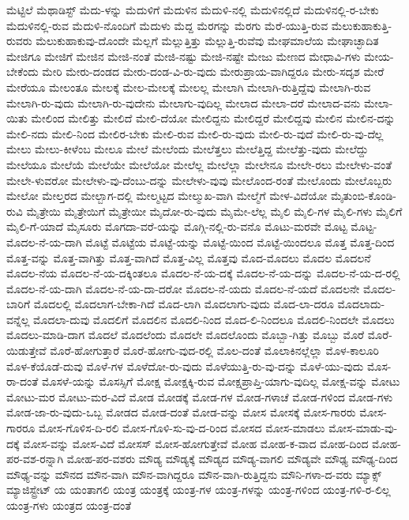 {ಮೆಟ್ಟಿಲೆ
ಮೆಥಾಡಿಸ್ಟ್
ಮೆದು-ಳನ್ನು
ಮೆದುಳಿಗೆ
ಮೆದುಳಿನ
ಮೆದುಳಿ-ನಲ್ಲಿ
ಮೆದುಳಿನಲ್ಲಿದೆ
ಮೆದುಳಿನಲ್ಲಿ-ರ-ಬೇಕು
ಮೆದುಳಿನಲ್ಲಿ-ರುವ
ಮೆದುಳಿ-ನೊಂದಿಗೆ
ಮೆದುಳು
ಮೆದ್ದ
ಮೆರಗನ್ನು
ಮೆರಗು
ಮೆರೆ-ಯುತ್ತಿ-ರುವ
ಮೆಲುಕುಹಾಕುತ್ತಿ-ರುವರು
ಮೆಲುಕುಹಾಕುವು-ದೊಂದೇ
ಮೆಲ್ಲಗೆ
ಮೆಲ್ಲುತ್ತಿತ್ತು
ಮೆಲ್ಲುತ್ತಿ-ರುವೆವು
ಮೇಘಮಾಲೆಯ
ಮೇಘಾಚ್ಛಾದಿತ
ಮೇಜಿಗೂ
ಮೇಜಿಗೆ
ಮೇಜಿನ
ಮೇಜಿ-ನಂತೆ
ಮೇಜಿ-ನಷ್ಟು
ಮೇಜಿ-ನಷ್ಟೇ
ಮೇಜು
ಮೇಣದ
ಮೇಧಾವಿ-ಗಳು
ಮೇಯ-ಬೇಕೆಂದು
ಮೇರಿ
ಮೇರು-ದಂಡದ
ಮೇರು-ದಂಡ-ವಿ-ರು-ವುದು
ಮೇರುಪ್ರಾಯ-ವಾಗಿದ್ದರೂ
ಮೇರು-ಸದೃಶ
ಮೇರೆ
ಮೇರೆಯೂ
ಮೇಲಂತೂ
ಮೇಲಕ್ಕೆ
ಮೇಲ-ಮೇಲಕ್ಕೆ
ಮೇಲಲ್ಲ
ಮೇಲಾಗಿ
ಮೇಲಾಗಿ-ರುತ್ತಿದ್ದೆವು
ಮೇಲಾಗಿ-ರುವ
ಮೇಲಾಗಿ-ರು-ವುದು
ಮೇಲಾಗಿ-ರು-ವುದೇನು
ಮೇಲಾಗು-ವುದಿಲ್ಲ
ಮೇಲಾದ
ಮೇಲಾ-ದರೆ
ಮೇಲಾದ-ವನು
ಮೇಲಾ-ಯಿತು
ಮೇಲಿಂದ
ಮೇಲಿತ್ತು
ಮೇಲಿದೆ
ಮೇಲಿ-ದೆಯೋ
ಮೇಲಿದ್ದನು
ಮೇಲಿದ್ದರೆ
ಮೇಲಿದ್ದವು
ಮೇಲಿನ
ಮೇಲಿನ-ದನ್ನು
ಮೇಲಿ-ನದು
ಮೇಲಿ-ನಿಂದ
ಮೇಲಿರ-ಬೇಕು
ಮೇಲಿ-ರುವ
ಮೇಲಿ-ರು-ವುದು
ಮೇಲಿ-ರು-ವುದೆ
ಮೇಲಿ-ರು-ವು-ದೆಲ್ಲ
ಮೇಲು
ಮೇಲು-ಕೀಳೆಂಬ
ಮೇಲೂ
ಮೇಲೆ
ಮೇಲೆಂದು
ಮೇಲೆತ್ತಲು
ಮೇಲೆತ್ತಿದ್ದ
ಮೇಲೆತ್ತು-ವುದು
ಮೇಲೆದ್ದು
ಮೇಲೆಯೂ
ಮೇಲೆಯೆ
ಮೇಲೆಯೇ
ಮೇಲೆಯೋ
ಮೇಲೆಲ್ಲ
ಮೇಲೆಲ್ಲಾ
ಮೇಲೇನೂ
ಮೇಲೇ-ರಲು
ಮೇಲೇಳು-ವಂತೆ
ಮೇಲೇ-ಳುವರೋ
ಮೇಲೇಳು-ವು-ದೆಂಬು-ದನ್ನು
ಮೇಲೇಳು-ವುವು
ಮೇಲೊಂದ-ರಂತೆ
ಮೇಲೊಂದು
ಮೇಲೊಬ್ಬರು
ಮೇಲೋ
ಮೇಲ್ತರದ
ಮೇಲ್ಬಾಗ-ದಲ್ಲಿ
ಮೇಲ್ಮಟ್ಟದ
ಮೇಲ್ಮುಖ-ವಾಗಿ
ಮೇಲ್ಮೆಗೆ
ಮೇಳ-ವಿದೆಯೋ
ಮೈತುಂಬಿ-ಕೊಂಡಿ-ರುವಿ
ಮೈತ್ರೇಯಿ
ಮೈತ್ರೇಯಿಗೆ
ಮೈತ್ರೇಯೀ
ಮೈದೋ-ರು-ವುದು
ಮೈಮೇ-ಲೆಲ್ಲ
ಮೈಲಿ
ಮೈಲಿ-ಗಳ
ಮೈಲಿ-ಗಳು
ಮೈಲಿಗೆ
ಮೈಲಿ-ಗೆ-ಯಾದೆ
ಮೈಸೂರು
ಮೊಗದಾ-ವರೆ-ಯನ್ನು
ಮೊಗ್ಗಿ-ನಲ್ಲಿ-ರು-ವನೊ
ಮೊಟು-ಮರವೇ
ಮೊಟ್ಟ
ಮೊಟ್ಟ-ಮೊದಲ-ನೆ-ಯ-ದಾಗಿ
ಮೊಟ್ಟೆ
ಮೊಟ್ಟೆಯ
ಮೊಟ್ಟೆ-ಯನ್ನು
ಮೊಟ್ಟೆ-ಯಿಂದ
ಮೊಟ್ಟೆ-ಯಿಂದಲೂ
ಮೊತ್ತ
ಮೊತ್ತ-ದಿಂದ
ಮೊತ್ತ-ವನ್ನು
ಮೊತ್ತ-ವಾಗಿತ್ತು
ಮೊತ್ತ-ವಾಗಿದೆ
ಮೊತ್ತ-ವಿಲ್ಲ
ಮೊತ್ತವು
ಮೊದ-ಮೊದಲು
ಮೊದಲ
ಮೊದಲನೆ
ಮೊದಲ-ನೆಯ
ಮೊದಲ-ನೆ-ಯ-ದಕ್ಕಿಂತಲೂ
ಮೊದಲ-ನೆ-ಯ-ದಕ್ಕೆ
ಮೊದಲ-ನೆ-ಯ-ದನ್ನು
ಮೊದಲ-ನೆ-ಯ-ದ-ರಲ್ಲಿ
ಮೊದಲ-ನೆ-ಯ-ದಾಗಿ
ಮೊದಲ-ನೆ-ಯ-ದಾ-ದರೋ
ಮೊದಲ-ನೆ-ಯದು
ಮೊದಲ-ನೆ-ಯದೆ
ಮೊದಲನೇ
ಮೊದಲ-ಬಾರಿಗೆ
ಮೊದಲಲ್ಲಿ
ಮೊದಲಾಗ-ಬೇಕಾ-ಗಿದೆ
ಮೊದ-ಲಾಗಿ
ಮೊದಲಾಗು-ವುದು
ಮೊದ-ಲಾ-ದರೂ
ಮೊದಲಾದು-ವನ್ನೆಲ್ಲ
ಮೊದಲಾ-ದುವು
ಮೊದಲಿಗೆ
ಮೊದಲಿನ
ಮೊದಲಿ-ನಿಂದ
ಮೊದ-ಲಿ-ನಿಂದಲೂ
ಮೊದಲಿ-ನಿಂದಲೇ
ಮೊದಲು
ಮೊದಲು-ಮಾಡಿ-ದಾಗ
ಮೊದಲೆ
ಮೊದಲೆಂದು
ಮೊದಲೇ
ಮೊದಲೊಂದು
ಮೊಬ್ಬಾ-ಗಿತ್ತು
ಮೊಬ್ಬು
ಮೊರೆ
ಮೊರೆ-ಯಿಡುತ್ತೇವೆ
ಮೊರೆ-ಹೋಗುತ್ತಾರೆ
ಮೊರೆ-ಹೋಗು-ವುದ-ರಲ್ಲಿ
ಮೊಲ-ದಂತೆ
ಮೊಲಾಕಿನಲ್ಲೆಲ್ಲಾ
ಮೊಳ-ಕಾಲೂರಿ
ಮೊಳ-ಕೆಯೊಡೆ-ದುವು
ಮೊಳೆ-ಗಳ
ಮೊಳೆದೋ-ರು-ವುದು
ಮೊಳೆಯುತ್ತಿ-ರು-ವು-ದನ್ನು
ಮೊಳೆ-ಯು-ವುದು
ಮೊಸ-ರಾ-ದಂತೆ
ಮೊಸಳೆ-ಯನ್ನು
ಮೊಸಸ್ಸಿಗೆ
ಮೋಕ್ಷ
ಮೋಕ್ಷಕ್ಕಿ-ರುವ
ಮೋಕ್ಷಪ್ರಾಪ್ತಿ-ಯಾಗು-ವುದಿಲ್ಲ
ಮೋಕ್ಷ-ವನ್ನು
ಮೋಟು
ಮೋಟು-ಮರ
ಮೋಟು-ಮರ-ವಿದೆ
ಮೋಡ
ಮೋಡಕ್ಕೆ
ಮೋಡ-ಗಳ
ಮೋಡ-ಗಳಾಚೆ
ಮೋಡ-ಗಳಿಂದ
ಮೋಡ-ಗಳು
ಮೋಡ-ಜಾ-ರು-ವುದು-ಒಬ್ಬ
ಮೋಡದ
ಮೋಡ-ದಂತೆ
ಮೋಡ-ವನ್ನು
ಮೋಸ
ಮೋಸಕ್ಕೆ
ಮೋಸ-ಗಾರರು
ಮೋಸ-ಗಾರರೂ
ಮೋಸ-ಗೊಳಿಸ-ದಿ-ರಲಿ
ಮೋಸ-ಗೊಳಿ-ಸು-ವು-ದ-ರಿಂದ
ಮೋಸದ
ಮೋಸ-ಮಾಡಲು
ಮೋಸ-ಮಾಡು-ವು-ದಕ್ಕೆ
ಮೋಸ-ವನ್ನು
ಮೋಸ-ವಿದೆ
ಮೋಸಸ್
ಮೋಸ-ಹೋಗುತ್ತೇವೆ
ಮೋಹ
ಮೋಹ-ಕ-ವಾದ
ಮೋಹ-ದಿಂದ
ಮೋಹ-ಪರ-ವಶ-ರನ್ನಾಗಿ
ಮೋಹ-ಪರ-ವಶರು
ಮೌಡ್ಯ
ಮೌಡ್ಯಕ್ಕೆ
ಮೌಡ್ಯದ
ಮೌಡ್ಯ-ವಾಗಲಿ
ಮೌಡ್ಯವೇ
ಮೌಢ್ಯ
ಮೌಢ್ಯ-ದಿಂದ
ಮೌಢ್ಯ-ವನ್ನು
ಮೌನದ
ಮೌನ-ವಾಗಿ
ಮೌನ-ವಾಗಿದ್ದರೂ
ಮೌನ-ವಾಗಿ-ರುತ್ತಿದ್ದನು
ಮೌನಿ-ಗಳಾ-ದ-ವರು
ಮ್ಯಾಕ್ಸ್
ಮ್ಯಾಜಿಸ್ಟ್ರೇಟ್
ಯ
ಯಂತಾಗಲಿ
ಯಂತ್ರ
ಯಂತ್ರಕ್ಕೆ
ಯಂತ್ರ-ಗಳ
ಯಂತ್ರ-ಗಳನ್ನು
ಯಂತ್ರ-ಗಳಿಂದ
ಯಂತ್ರ-ಗಳಿ-ರ-ಲಿಲ್ಲ
ಯಂತ್ರ-ಗಳು
ಯಂತ್ರದ
ಯಂತ್ರ-ದಂತೆ
}
